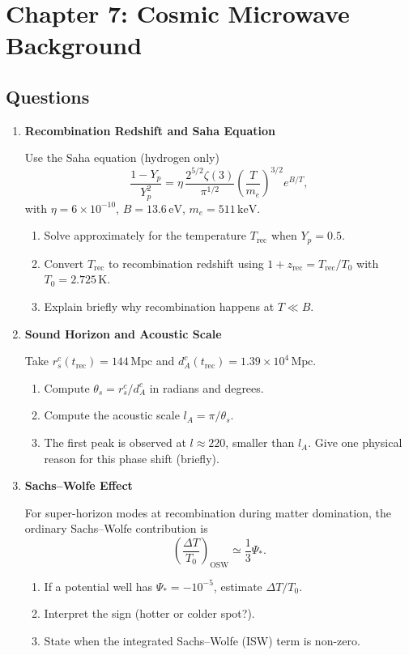\clearpage
\section{Chapter 7: Cosmic Microwave Background}

\subsection{Questions}

\begin{enumerate}[label=7.\arabic*]
  \item \label{q:7.1} \textbf{Recombination Redshift and Saha Equation}
  
  Use the Saha equation (hydrogen only)
  \[
    \frac{1 - Y_p}{Y_p^2} = \eta\,\frac{2^{5/2}\zeta(3)}{\pi^{1/2}}
    \left(\frac{T}{m_e}\right)^{3/2} e^{B/T},
  \]
  with $\eta = 6\times 10^{-10}$, $B=13.6\,\mathrm{eV}$, $m_e=511\,\mathrm{keV}$.
  \begin{enumerate}[label=(\alph*)]
    \item Solve approximately for the temperature $T_{\mathrm{rec}}$ when $Y_p=0.5$.
    \item Convert $T_{\mathrm{rec}}$ to recombination redshift using
    $1+z_{\mathrm{rec}} = T_{\mathrm{rec}}/T_0$ with $T_0 = 2.725\,\mathrm{K}$.
    \item Explain briefly why recombination happens at $T\ll B$.
  \end{enumerate}

  \item \label{q:7.2} \textbf{Sound Horizon and Acoustic Scale}
  
  Take $r_s^c(t_{\mathrm{rec}})=144\,\mathrm{Mpc}$ and
  $d_A^c(t_{\mathrm{rec}})=1.39\times 10^4\,\mathrm{Mpc}$.
  \begin{enumerate}[label=(\alph*)]
    \item Compute $\theta_s = r_s^c/d_A^c$ in radians and degrees.
    \item Compute the acoustic scale $l_A = \pi/\theta_s$.
    \item The first peak is observed at $l\approx 220$, smaller than $l_A$.
    Give one physical reason for this phase shift (briefly).
  \end{enumerate}

  \item \label{q:7.3} \textbf{Sachs--Wolfe Effect}
  
  For super-horizon modes at recombination during matter domination, the ordinary Sachs--Wolfe
  contribution is
  \[
    \left(\frac{\Delta T}{T_0}\right)_{\mathrm{OSW}} \simeq \frac{1}{3}\Psi_*.
  \]
  \begin{enumerate}[label=(\alph*)]
    \item If a potential well has $\Psi_*=-10^{-5}$, estimate $\Delta T/T_0$.
    \item Interpret the sign (hotter or colder spot?).
    \item State when the integrated Sachs--Wolfe (ISW) term is non-zero.
  \end{enumerate}


\end{enumerate}
